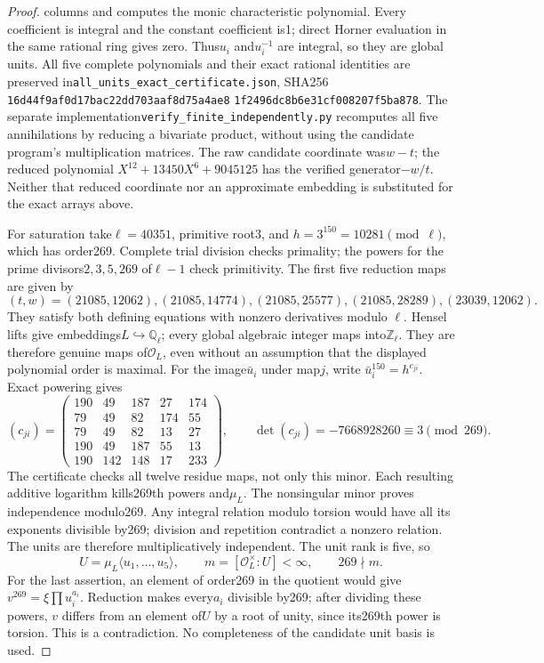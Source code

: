 \begin{proof}
columns and computes the monic characteristic polynomial.  Every
coefficient is integral and the constant coefficient is1; direct
Horner evaluation in the same rational ring gives zero.
Thus$u_i$ and$u_i^{-1}$ are integral, so they are global units.
All five complete polynomials and their exact rational identities
are preserved in\texttt{all\_units\_exact\_certificate.json}, SHA256
\texttt{16d44f9af0d17bac22dd703aaf8d75a4ae8}\allowbreak
\texttt{1f2496dc8b6e31cf008207f5ba878}.
The separate implementation\texttt{verify\_finite\_independently.py}
recomputes all five annihilations by reducing a bivariate product,
without using the candidate program's multiplication matrices.
The raw candidate coordinate was$w-t$; the reduced polynomial
$X^{12}+13450X^6+9045125$ has the verified generator$-w/t$.
Neither that reduced coordinate nor an approximate embedding is
substituted for the exact arrays above.

For saturation take$\ell=40351$, primitive root3, and
$h=3^{150}=10281\pmod\ell$, which has order269.
Complete trial division checks primality; the powers for the prime
divisors$2,3,5,269$ of$\ell-1$ check primitivity.
The first five reduction maps are given by
\[
 (t,w)=(21085,12062),(21085,14774),(21085,25577),
       (21085,28289),(23039,12062).
 \tag{RQC.6}
\]
They satisfy both defining equations with nonzero derivatives modulo
$\ell$.  Hensel lifts give embeddings$L\hookrightarrow\mathbb Q_\ell$;
every global algebraic integer maps into$\mathbb Z_\ell$.
They are therefore genuine maps of$\mathcal O_L$, even without an
assumption that the displayed polynomial order is maximal.
For the image$\bar u_i$ under map$j$, write
$\bar u_i^{150}=h^{c_{ji}}$.  Exact powering gives
\[
 (c_{ji})=
 \begin{pmatrix}
 190&49&187&27&174\\
 79&49&82&174&55\\
 79&49&82&13&27\\
 190&49&187&55&13\\
 190&142&148&17&233
 \end{pmatrix},\qquad
 \det(c_{ji})=-7668928260\equiv3\pmod{269}.
 \tag{RQC.7}
\]
The certificate checks all twelve residue maps, not only this minor.
Each resulting additive logarithm kills269th powers and$\mu_L$.
The nonsingular minor proves independence modulo269.
Any integral relation modulo torsion would have all its exponents
divisible by269; division and repetition contradict a nonzero
relation.  The units are therefore multiplicatively independent.
The unit rank is five, so
\[
 U=\mu_L\langle u_1,\ldots,u_5\rangle,\qquad
 m=[\mathcal O_L^\times:U]<\infty,\qquad269\nmid m.
 \tag{RQC.8}
\]
For the last assertion, an element of order269 in the quotient would
give$v^{269}=\xi\prod u_i^{a_i}$.  Reduction makes every$a_i$ divisible
by269; after dividing these powers, $v$ differs from an element of$U$
by a root of unity, since its269th power is torsion.  This is a
contradiction.  No completeness of the candidate unit basis is used.


\end{proof}
